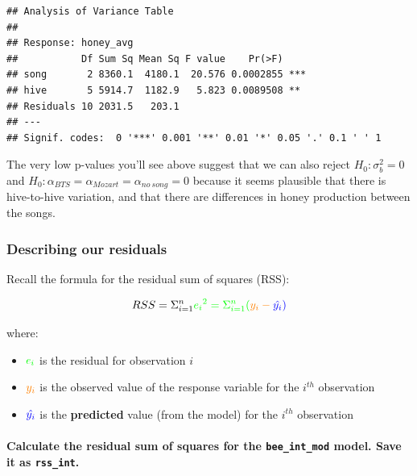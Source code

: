 \documentclass[
  openany]{book}
\providecommand{\tightlist}{%
  \setlength{\itemsep}{0pt}\setlength{\parskip}{0pt}}
\begin{document}
\begin{verbatim}
## Analysis of Variance Table
## 
## Response: honey_avg
##           Df Sum Sq Mean Sq F value    Pr(>F)    
## song       2 8360.1  4180.1  20.576 0.0002855 ***
## hive       5 5914.7  1182.9   5.823 0.0089508 ** 
## Residuals 10 2031.5   203.1                      
## ---
## Signif. codes:  0 '***' 0.001 '**' 0.01 '*' 0.05 '.' 0.1 ' ' 1
\end{verbatim}

The very low p-values you'll see above suggest that we can also reject \(H_0: \sigma^2_b = 0\) and \(H_0: \alpha_{BTS} = \alpha_{Mozart} = \alpha_{no\ song} = 0\) because it seems plausible that there is hive-to-hive variation, and that there are differences in honey production between the songs.

\hypertarget{describing-our-residuals}{%
\subsubsection{Describing our residuals}\label{describing-our-residuals}}

Recall the formula for the residual sum of squares (RSS):

\[RSS = \Sigma^{n}_{i=1} \color{green}{e_i}^2 = \Sigma^{n}_{i=1} (\color{orange}{y_i} - \color{blue}{\hat{y_i}})\]

where:

\begin{itemize}
\tightlist
\item
  \(\color{green}{e_i}\) is the residual for observation \(i\)\\
\item
  \(\color{orange}{y_i}\) is the observed value of the response variable for the \(i^{th}\) observation\\
\item
  \(\color{blue}{\hat{y_i}}\) is the \textbf{predicted} value (from the model) for the \(i^{th}\) observation
\end{itemize}

\hypertarget{calculate-the-residual-sum-of-squares-for-the-bee_int_mod-model.-save-it-as-rss_int.}{%
\paragraph{\texorpdfstring{Calculate the residual sum of squares for the \texttt{bee\_int\_mod} model. Save it as \texttt{rss\_int}.}{Calculate the residual sum of squares for the bee\_int\_mod model. Save it as rss\_int.}}\label{calculate-the-residual-sum-of-squares-for-the-bee_int_mod-model.-save-it-as-rss_int.}}
\end{document}
